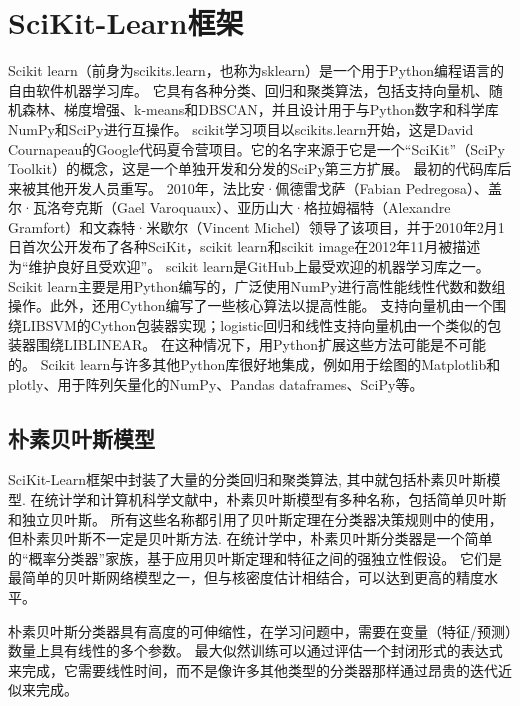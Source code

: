 \section{SciKit-Learn框架}

Scikit learn（前身为scikits.learn，也称为sklearn）是一个用于Python编程语言的自由软件机器学习库\cite{pedregosa2011scikit}。
它具有各种分类、回归和聚类算法，包括支持向量机、随机森林、梯度增强、k-means和DBSCAN，并且设计用于与Python数字和科学库NumPy和SciPy进行互操作。
scikit学习项目以scikits.learn开始，这是David Cournapeau的Google代码夏令营项目。它的名字来源于它是一个“SciKit”（SciPy Toolkit）的概念，这是一个单独开发和分发的SciPy\cite{kramer2016scikit}第三方扩展。
最初的代码库后来被其他开发人员重写。
2010年，法比安·佩德雷戈萨（Fabian Pedregosa）、盖尔·瓦洛夸克斯（Gael Varoquaux）、亚历山大·格拉姆福特（Alexandre Gramfort）和文森特·米歇尔（Vincent Michel）领导了该项目，并于2010年2月1日首次公开发布了各种SciKit，scikit learn和scikit image在2012年11月被描述为“维护良好且受欢迎”\cite{bressert2012scipy}。
scikit learn是GitHub\cite{gonzalez2020state}上最受欢迎的机器学习库之一。
Scikit learn主要是用Python编写的，广泛使用NumPy进行高性能线性代数和数组操作。此外，还用Cython编写了一些核心算法以提高性能。
支持向量机由一个围绕LIBSVM的Cython包装器实现；logistic回归和线性支持向量机由一个类似的包装器围绕LIBLINEAR。
在这种情况下，用Python扩展这些方法可能是不可能的。
Scikit learn与许多其他Python库很好地集成，例如用于绘图的Matplotlib和plotly、用于阵列矢量化的NumPy、Pandas dataframes、SciPy等。

\subsection{朴素贝叶斯模型}

SciKit-Learn框架中封装了大量的分类回归和聚类算法, 其中就包括朴素贝叶斯模型.
在统计学和计算机科学文献中，朴素贝叶斯模型有多种名称，包括简单贝叶斯和独立贝叶斯。
所有这些名称都引用了贝叶斯定理在分类器决策规则中的使用，但朴素贝叶斯不一定是贝叶斯方法.
在统计学中，朴素贝叶斯分类器是一个简单的“概率分类器”家族\cite{larranaga2013review}，基于应用贝叶斯定理和特征之间的强独立性假设。
它们是最简单的贝叶斯网络模型之一，但与核密度估计相结合，可以达到更高的精度水平\cite{piryonesi2020role}。

朴素贝叶斯分类器具有高度的可伸缩性，在学习问题中，需要在变量（特征/预测）数量上具有线性的多个参数。
最大似然训练可以通过评估一个封闭形式的表达式来完成\cite{russell2002artificial}，它需要线性时间，而不是像许多其他类型的分类器那样通过昂贵的迭代近似来完成。

